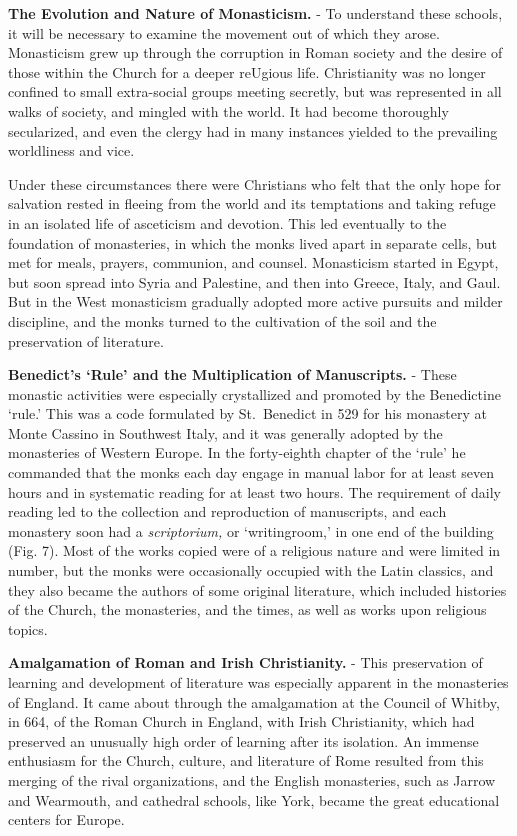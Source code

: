 \documentclass[
]{book}
\begin{document}
\textbf{The Evolution and Nature of Monasticism.} - To understand these schools, it will be necessary to examine the movement out of which they arose. Monasticism grew up through the corruption in Roman society and the desire of those within the Church for a deeper reUgious life. Christianity was no longer confined to small extra-social groups meeting secretly, but was represented in all walks of society, and mingled with the world. It had become thoroughly secularized, and even the clergy had in many instances yielded to the prevailing worldliness and vice.

Under these circumstances there were Christians who felt that the only hope for salvation rested in fleeing from the world and its temptations and taking refuge in an isolated life of asceticism and devotion. This led eventually to the foundation of monasteries, in which the monks lived apart in separate cells, but met for meals, prayers, communion, and counsel. Monasticism started in Egypt, but soon spread into Syria and Palestine, and then into Greece, Italy, and Gaul. But in the West monasticism gradually adopted more active pursuits and milder discipline, and the monks turned to the cultivation of the soil and the preservation of literature.

\textbf{Benedict's `Rule' and the Multiplication of Manuscripts.} - These monastic activities were especially crystallized and promoted by the Benedictine `rule.' This was a code formulated by St.~Benedict in 529 for his monastery at Monte Cassino in Southwest Italy, and it was generally adopted by the monasteries of Western Europe. In the forty-eighth chapter of the `rule' he commanded that the monks each day engage in manual labor for at least seven hours and in systematic reading for at least two hours. The requirement of daily reading led to the collection and reproduction of manuscripts, and each monastery soon had a \emph{scriptorium,} or `writingroom,' in one end of the building (Fig. 7). Most of the works copied were of a religious nature and were limited in number, but the monks were occasionally occupied with the Latin classics, and they also became the authors of some original literature, which included histories of the Church, the monasteries, and the times, as well as works upon religious topics.

\textbf{Amalgamation of Roman and Irish Christianity.} - This preservation of learning and development of literature was especially apparent in the monasteries of England. It came about through the amalgamation at the Council of Whitby, in 664, of the Roman Church in England, with Irish Christianity, which had preserved an unusually high order of learning after its isolation. An immense enthusiasm for the Church, culture, and literature of Rome resulted from this merging of the rival organizations, and the English monasteries, such as Jarrow and Wearmouth, and cathedral schools, like York, became the great educational centers for Europe.
\end{document}
